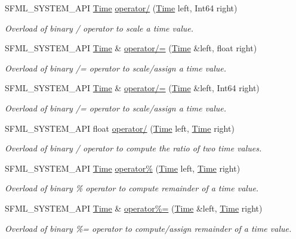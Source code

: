 \begin{DoxyCompactItemize}
S\+F\+M\+L\+\_\+\+S\+Y\+S\+T\+E\+M\+\_\+\+A\+PI \hyperlink{classsf_1_1_time}{Time} \hyperlink{classsf_1_1_time_ab72f2de3e2bb592b4b4008dc1ac79056}{operator/} (\hyperlink{classsf_1_1_time}{Time} left, Int64 right)
\begin{DoxyCompactList}\small\item\em Overload of binary / operator to scale a time value. \end{DoxyCompactList}\item 
S\+F\+M\+L\+\_\+\+S\+Y\+S\+T\+E\+M\+\_\+\+A\+PI \hyperlink{classsf_1_1_time}{Time} \& \hyperlink{classsf_1_1_time_a9835490c54cab06492ec3aa9e9275ef9}{operator/=} (\hyperlink{classsf_1_1_time}{Time} \&left, float right)
\begin{DoxyCompactList}\small\item\em Overload of binary /= operator to scale/assign a time value. \end{DoxyCompactList}\item 
S\+F\+M\+L\+\_\+\+S\+Y\+S\+T\+E\+M\+\_\+\+A\+PI \hyperlink{classsf_1_1_time}{Time} \& \hyperlink{classsf_1_1_time_ad51871e3db77def834ae8688e64504ff}{operator/=} (\hyperlink{classsf_1_1_time}{Time} \&left, Int64 right)
\begin{DoxyCompactList}\small\item\em Overload of binary /= operator to scale/assign a time value. \end{DoxyCompactList}\item 
S\+F\+M\+L\+\_\+\+S\+Y\+S\+T\+E\+M\+\_\+\+A\+PI float \hyperlink{classsf_1_1_time_ac3ae4f4d24a93e088d8e36d68322ea0f}{operator/} (\hyperlink{classsf_1_1_time}{Time} left, \hyperlink{classsf_1_1_time}{Time} right)
\begin{DoxyCompactList}\small\item\em Overload of binary / operator to compute the ratio of two time values. \end{DoxyCompactList}\item 
S\+F\+M\+L\+\_\+\+S\+Y\+S\+T\+E\+M\+\_\+\+A\+PI \hyperlink{classsf_1_1_time}{Time} \hyperlink{classsf_1_1_time_aafb8b12fb0ac0e366d6ea9c9e9f93335}{operator\%} (\hyperlink{classsf_1_1_time}{Time} left, \hyperlink{classsf_1_1_time}{Time} right)
\begin{DoxyCompactList}\small\item\em Overload of binary \% operator to compute remainder of a time value. \end{DoxyCompactList}\item 
S\+F\+M\+L\+\_\+\+S\+Y\+S\+T\+E\+M\+\_\+\+A\+PI \hyperlink{classsf_1_1_time}{Time} \& \hyperlink{classsf_1_1_time_af12dd271f14a17b58c9d737395e776d4}{operator\%=} (\hyperlink{classsf_1_1_time}{Time} \&left, \hyperlink{classsf_1_1_time}{Time} right)
\begin{DoxyCompactList}\small\item\em Overload of binary \%= operator to compute/assign remainder of a time value. \end{DoxyCompactList}\end{DoxyCompactItemize}


